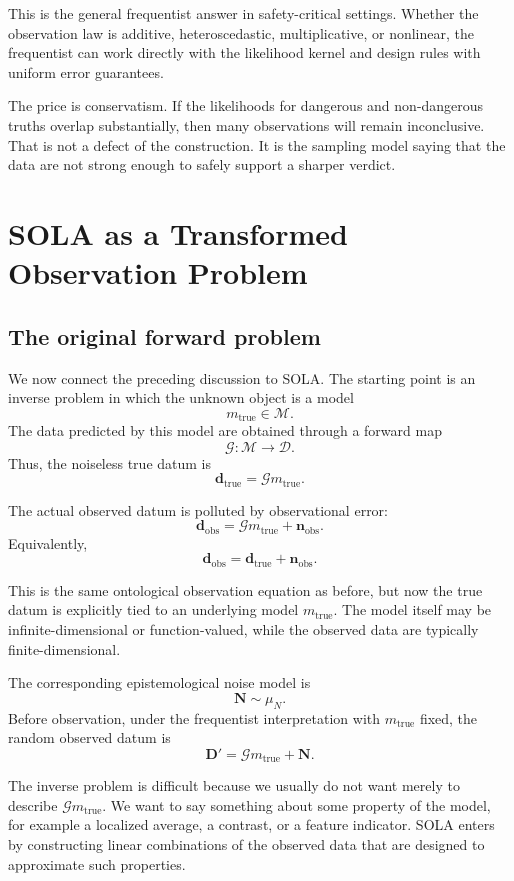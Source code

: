 \documentclass[11pt]{article}
\newcommand{\Mspace}{\mathcal M}
\newcommand{\Dspace}{\mathcal D}
\newcommand{\muN}{\mu_N}
\newcommand{\Dobsrand}{\mathbf D'}
\newcommand{\Nrand}{\mathbf N}
\newcommand{\dtrue}{\mathbf d_{\mathrm{true}}}
\newcommand{\dobs}{\mathbf d_{\mathrm{obs}}}
\newcommand{\nobs}{\mathbf n_{\mathrm{obs}}}
\newcommand{\G}{\mathcal G}
\begin{document}
This is the general frequentist answer in safety-critical settings. Whether the observation law is additive, heteroscedastic, multiplicative, or nonlinear, the frequentist can work directly with the likelihood kernel and design rules with uniform error guarantees.

The price is conservatism. If the likelihoods for dangerous and non-dangerous truths overlap substantially, then many observations will remain inconclusive. That is not a defect of the construction. It is the sampling model saying that the data are not strong enough to safely support a sharper verdict.

\section{SOLA as a Transformed Observation Problem}

\subsection{The original forward problem}

We now connect the preceding discussion to SOLA. The starting point is an inverse problem in which the unknown object is a model
\[
    m_{\mathrm{true}}\in\Mspace.
\]
The data predicted by this model are obtained through a forward map
\[
    \G:\Mspace\to\Dspace.
\]
Thus, the noiseless true datum is
\[
    \dtrue=\G m_{\mathrm{true}}.
\]

The actual observed datum is polluted by observational error:
\[
    \dobs
    =
    \G m_{\mathrm{true}}
    +
    \nobs.
\]
Equivalently,
\[
    \dobs=\dtrue+\nobs.
\]

This is the same ontological observation equation as before, but now the true datum is explicitly tied to an underlying model \(m_{\mathrm{true}}\). The model itself may be infinite-dimensional or function-valued, while the observed data are typically finite-dimensional.

The corresponding epistemological noise model is
\[
    \Nrand\sim\muN.
\]
Before observation, under the frequentist interpretation with \(m_{\mathrm{true}}\) fixed, the random observed datum is
\[
    \Dobsrand
    =
    \G m_{\mathrm{true}}
    +
    \Nrand.
\]

The inverse problem is difficult because we usually do not want merely to describe \(\G m_{\mathrm{true}}\). We want to say something about some property of the model, for example a localized average, a contrast, or a feature indicator. SOLA enters by constructing linear combinations of the observed data that are designed to approximate such properties.
\end{document}
